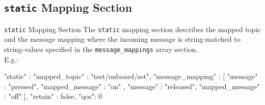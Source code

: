 ﻿\subsection{\texttt{static} Mapping Section}

\begin{frame}[fragile]{\texttt{static} Mapping Section}
  The \textcolor{fh-ooe-red}{\texttt{static}} mapping section describes the mapped topic and the message mapping where the \textcolor{fh-ooe-red}{incoming message} is \textcolor{fh-ooe-red}{string-matched} to \textcolor{fh-ooe-red}{string-values} specified in the \texttt{\textcolor{fh-ooe-red}{message\_mappings}} array section.\\
  E.g.:

  \begin{jsoncode}[gobble=4]
    {
        "static" : {
            "mapped_topic" : "test/onboard/set",
            "message_mapping" : [{
                "message" : "pressed",
                "mapped_message" : "on"
            },{
                "message" : "released",
                "mapped_message" : "off"
            }],
            "retain" : false,
            "qos": 0
        }
    }
  \end{jsoncode}
\end{frame}

